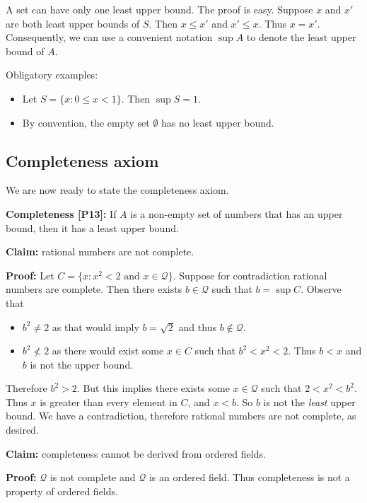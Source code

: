 A set can have only one least upper bound. The proof is easy. Suppose
$x$ and $x'$ are both least upper bounds of $S$. Then $x\leq x'$ and
$x'\leq x$. Thus $x=x'$. Consequently, we can use a convenient notation
$\sup A$ to denote the least upper bound of $A$.

\vs

Obligatory examples:
\begin{itemize}
\item Let $S=\{x:0\leq x<1\}$. Then $\sup S=1$.
\item By convention, the empty set $\emptyset$ has no least upper bound.
\end{itemize}

\subsection{Completeness axiom}
We are now ready to state the completeness axiom.

\vs

\textbf{Completeness [P13]:} If $A$ is a non-empty set of numbers that
has an upper bound, then it has a least upper bound.

\vs

\textbf{Claim:} rational numbers are not complete.

\textbf{Proof:} Let $C=\{x:x^{2}<2\text{ and }x\in\mathcal{Q}\}$. Suppose for
contradiction rational numbers are complete. Then there exists
$b\in\mathcal{Q}$ such that $b=\sup C$. Observe that
\begin{itemize}
\item $b^{2}\neq2$ as that would imply $b=\sqrt{2}$ and thus $b\notin\mathcal{Q}$.
\item $b^{2}\not<2$ as there would exist some $x\in C$ such that
  $b^{2}<x^{2}<2$. Thus $b<x$ and $b$ is not the upper bound.
\end{itemize}

Therefore $b^{2}>2$. But this implies there exists some
$x\in\mathcal{Q}$ such that $2<x^{2}<b^{2}$. Thus $x$ is greater than every
element in $C$, and $x<b$. So $b$ is not the \textit{least} upper
bound. We have a contradiction, therefore rational numbers are not
complete, as desired.

\vs

\textbf{Claim:} completeness cannot be derived from ordered fields.

\textbf{Proof:} $\mathcal{Q}$ is not complete and $\mathcal{Q}$ is an ordered field. Thus
completeness is not a property of ordered fields.

